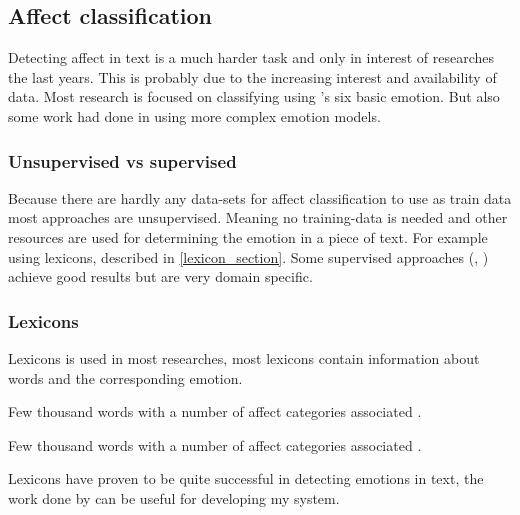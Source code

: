 \documentclass[
10pt, %
a4paper, %
oneside, %
headinclude,footinclude, %
BCOR5mm, %
]{scrartcl}
\begin{document}
\subsection{Affect classification}
Detecting affect in text is a much harder task and only in interest of researches the last years. This is probably due to the increasing interest and availability of data. Most research is focused on classifying using \citeauthor{ekman1992argument}'s six basic emotion. But also some work had done in using more complex emotion models.


\subsubsection{Unsupervised vs supervised}
Because there are hardly any data-sets for affect classification to use as train data most approaches are unsupervised. Meaning no training-data is needed and other resources are used for determining the emotion in a piece of text. For example using lexicons, described in \ref{lexicon_section}. Some supervised approaches (\citep{chaffar2011using}, \citep{kim2010evaluation}) achieve good results but are very domain specific.


\subsubsection{Lexicons}
\label{lexion_section}
Lexicons is used in most researches, most lexicons contain information about words and the corresponding emotion.
\begin{description}[align=left]
\item [Wordnet affect lexicon] Few thousand words with a number of affect categories associated \citep{strapparava2004wordnet}.
\item [NRC 10] Few thousand words with a number of affect categories associated \citep{mohammad:2012:NAACL-HLT}.
\end{description}
Lexicons have proven to be quite successful in detecting emotions in text, the work done by \citeauthor{mohammad:2012:NAACL-HLT} can be useful for developing my system.




\end{document}
